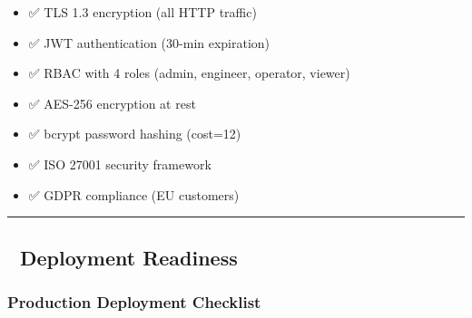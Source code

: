 \documentclass[
]{article}
\providecommand{\tightlist}{%
  \setlength{\itemsep}{0pt}\setlength{\parskip}{0pt}}
\begin{document}
\begin{itemize}
\tightlist
\item
  ✅ TLS 1.3 encryption (all HTTP traffic)
\item
  ✅ JWT authentication (30-min expiration)
\item
  ✅ RBAC with 4 roles (admin, engineer, operator, viewer)
\item
  ✅ AES-256 encryption at rest
\item
  ✅ bcrypt password hashing (cost=12)
\item
  ✅ ISO 27001 security framework
\item
  ✅ GDPR compliance (EU customers)
\end{itemize}

\begin{center}\rule{0.5\linewidth}{0.5pt}\end{center}

\hypertarget{deployment-readiness}{%
\subsection{🚀 Deployment Readiness}\label{deployment-readiness}}

\hypertarget{production-deployment-checklist}{%
\subsubsection{Production Deployment
Checklist}\label{production-deployment-checklist}}
\end{document}
